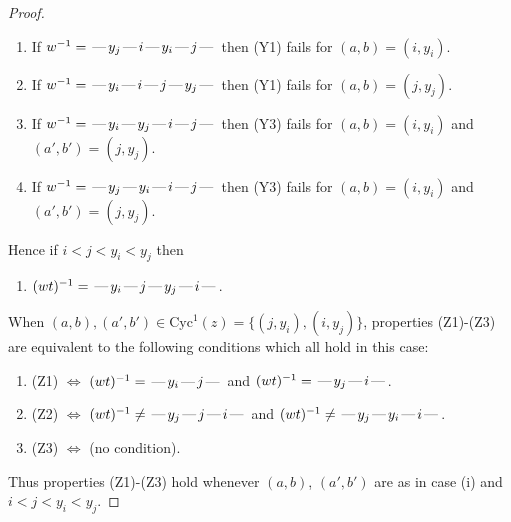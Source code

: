 \documentclass[10pt]{article}
\theoremstyle{definition}
\theoremstyle{definition}
\def\dash{\text{\hspace{0.5mm}---\hspace{0.5mm}}}
\def\Cyc{\mathrm{Cyc}}
\begin{document}
\begin{proof}
\begin{enumerate}
\item If $w^{-1} = \dash y_j\dash i\dash y_i\dash j\dash $ then (Y1) fails for $(a,b)=(i,y_i)$.
\item If $w^{-1} = \dash y_i\dash i\dash j\dash y_j\dash $ then (Y1) fails for $(a,b)=(j,y_j)$.
\item If $w^{-1} = \dash y_i\dash y_j\dash i\dash j\dash $ then (Y3) fails for $(a,b)=(i,y_i)$ and $(a',b')=(j,y_j)$.
\item If $w^{-1} = \dash y_j\dash y_i\dash i\dash j\dash $ then (Y3) fails for $(a,b)=(i,y_i)$ and $(a',b')=(j,y_j)$.
\end{enumerate}
Hence if $i < j < y_i < y_j$ then \begin{enumerate}\item[] $(wt)^{-1} = \dash y_i\dash j\dash y_j\dash i\dash $. \end{enumerate}
When $(a,b),(a',b')\in\Cyc^1(z)= \{(j,y_i),(i,y_j)\}$,
properties (Z1)-(Z3) are equivalent to the following conditions which all hold in this case:
\begin{enumerate}
\item[](Z1) $\Leftrightarrow$ $(wt)^{-1} = \dash y_i \dash j \dash$  and $(wt)^{-1} = \dash y_j \dash i \dash$.
\item[](Z2) $\Leftrightarrow$ $(wt)^{-1} \neq \dash y_j \dash j \dash i \dash$ and $(wt)^{-1}\neq \dash y_j \dash y_i \dash i \dash$.
\item[](Z3) $\Leftrightarrow$ (no condition).
\end{enumerate}
Thus properties (Z1)-(Z3) hold whenever $(a,b)$, $(a',b')$ are as in case (i) and $i < j < y_i < y_j$.

\end{proof}
\end{document}
